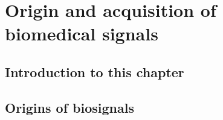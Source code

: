 





\glsresetall

\chapter{Origin and acquisition of biomedical signals}
\label{ch:biomedical_signals}

\section{Introduction to this chapter}
\label{sec:biomedical_signals_introduction}


\lipsum[1-3]


\section{Origins of biosignals}
\label{sec:biomedical_signals_origin}


